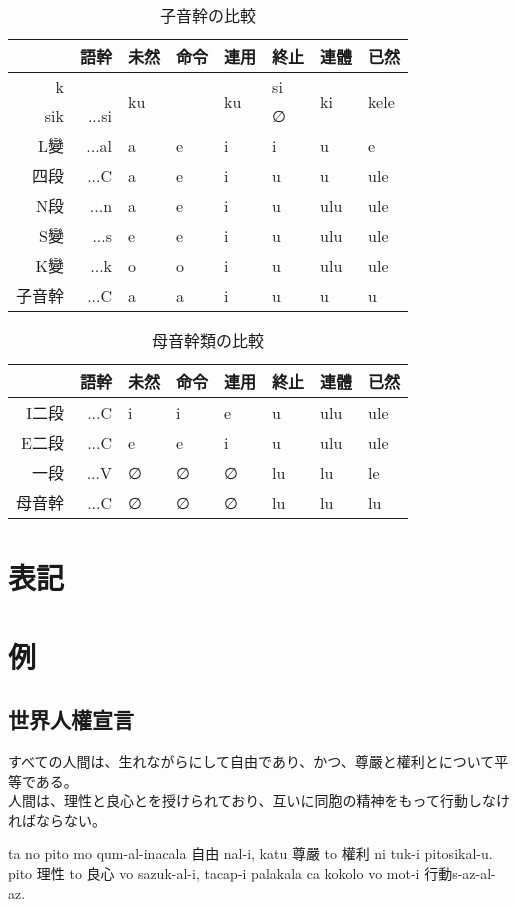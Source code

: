 \documentclass[]{jlreq}
\begin{document}
\begin{table}[h]\centering
  \begin{tabular}{rr|llllll}
           & 語幹  & 未然                & 命令 & 連用                & 終止 & 連體                & 已然                  \\
    \hline
    k      &       & \multirow{2}{*}{ku} &      & \multirow{2}{*}{ku} & si   & \multirow{2}{*}{ki} & \multirow{2}{*}{kele} \\
    sik    & ...si &                     &      &                     & ∅    &                     &                       \\
    L變    & ...al & a                   & e    & i                   & i    & u                   & e                     \\
    四段   & ...C  & a                   & e    & i                   & u    & u                   & ule                   \\
    N段    & ...n  & a                   & e    & i                   & u    & ulu                 & ule                   \\
    S變    & ...s  & e                   & e    & i                   & u    & ulu                 & ule                   \\
    K變    & ...k  & o                   & o    & i                   & u    & ulu                 & ule                   \\
    子音幹 & ...C  & a                   & a    & i                   & u    & u                   & u
  \end{tabular}
  \caption{子音幹の比較}
\end{table}

\begin{table}[h]\centering
  \begin{tabular}{rr|llllll}
           & 語幹 & 未然 & 命令 & 連用 & 終止 & 連體 & 已然 \\
    \hline
    I二段  & ...C & i    & i    & e    & u    & ulu  & ule  \\
    E二段  & ...C & e    & e    & i    & u    & ulu  & ule  \\
    一段   & ...V & ∅    & ∅    & ∅    & lu   & lu   & le   \\
    母音幹 & ...C & ∅    & ∅    & ∅    & lu   & lu   & lu   \\
  \end{tabular}
  \caption{母音幹類の比較}
\end{table}

\section{表記}

\section{例}

\subsection{世界人權宣言}
すべての人間は、生れながらにして自由であり、かつ、尊嚴と權利とについて平等である。\\
人間は、理性と良心とを授けられており、互いに同胞の精神をもって行動しなければならない。

ta no pito mo qum-al-inacala 自由 nal-i, katu 尊嚴 to 權利 ni tuk-i pitosikal-u.\\
pito 理性 to 良心 vo sazuk-al-i, tacap-i palakala ca kokolo vo mot-i 行動s-az-al-az.
\end{document}

